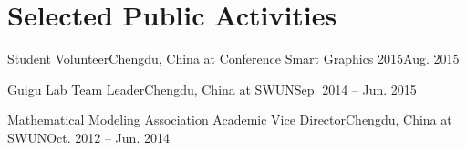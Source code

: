 \section{\textbf{Selected Public Activities}}
  \resumeSubHeadingListStart

    \resumeSubheading
        {Student Volunteer}{Chengdu, China}
        {at \href{http://www.smartgraphics.org/sg15/}{Conference Smart Graphics 2015}}{Aug. 2015}

    \resumeSubheading
        {Guigu Lab Team Leader}{Chengdu, China}
        {at SWUN}{Sep. 2014 -- Jun. 2015}

    \resumeSubheading
        {Mathematical Modeling Association Academic Vice Director}{Chengdu, China}
        {at SWUN}{Oct. 2012 -- Jun. 2014}

  \resumeSubHeadingListEnd